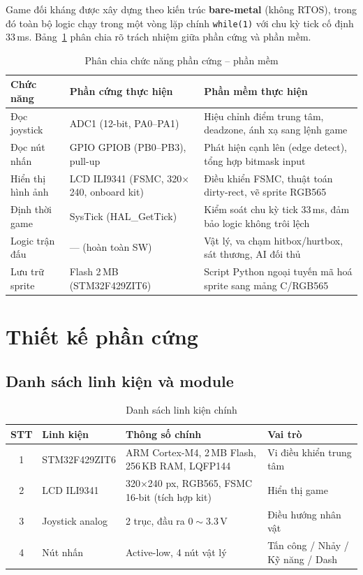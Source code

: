 \documentclass[a4paper,12pt]{report}
\begin{document}
Game đối kháng được xây dựng theo kiến trúc \textbf{bare-metal} (không RTOS), trong đó toàn bộ logic chạy trong một vòng lặp chính \texttt{while(1)} với chu kỳ tick cố định 33\,ms. Bảng~\ref{tab:hw-sw} phân chia rõ trách nhiệm giữa phần cứng và phần mềm.

\begin{table}[H]
\centering
\caption{Phân chia chức năng phần cứng -- phần mềm}
\label{tab:hw-sw}
\begin{tabular}{p{4cm} p{4.5cm} p{5.5cm}}
\toprule
\textbf{Chức năng} & \textbf{Phần cứng thực hiện} & \textbf{Phần mềm thực hiện} \\
\midrule
Đọc joystick & ADC1 (12-bit, PA0--PA1) & Hiệu chỉnh điểm trung tâm, deadzone, ánh xạ sang lệnh game \\
Đọc nút nhấn & GPIO GPIOB (PB0--PB3), pull-up & Phát hiện cạnh lên (edge detect), tổng hợp bitmask input \\
Hiển thị hình ảnh & LCD ILI9341 (FSMC, 320$\times$240, onboard kit) & Điều khiển FSMC, thuật toán dirty-rect, vẽ sprite RGB565 \\
Định thời game & SysTick (HAL\_GetTick) & Kiểm soát chu kỳ tick 33\,ms, đảm bảo logic không trôi lệch \\
Logic trận đấu & --- (hoàn toàn SW) & Vật lý, va chạm hitbox/hurtbox, sát thương, AI đối thủ \\
Lưu trữ sprite & Flash 2\,MB (STM32F429ZIT6) & Script Python ngoại tuyến mã hoá sprite sang mảng C/RGB565 \\
\bottomrule
\end{tabular}
\end{table}

\section{Thiết kế phần cứng}

\subsection{Danh sách linh kiện và module}

\begin{table}[H]
\centering
\caption{Danh sách linh kiện chính}
\label{tab:components}
\begin{tabular}{c p{3cm} p{6cm} p{3.5cm}}
\toprule
\textbf{STT} & \textbf{Linh kiện} & \textbf{Thông số chính} & \textbf{Vai trò} \\
\midrule
1 & STM32F429ZIT6 & ARM Cortex-M4, 2\,MB Flash, 256\,KB RAM, LQFP144 & Vi điều khiển trung tâm \\
2 & LCD ILI9341 & 320$\times$240 px, RGB565, FSMC 16-bit (tích hợp kit) & Hiển thị game \\
3 & Joystick analog & 2 trục, đầu ra $0\sim3.3$\,V & Điều hướng nhân vật \\
4 & Nút nhấn & Active-low, 4 nút vật lý & Tấn công / Nhảy / Kỹ năng / Dash \\
\bottomrule
\end{tabular}
\end{table}
\end{document}
